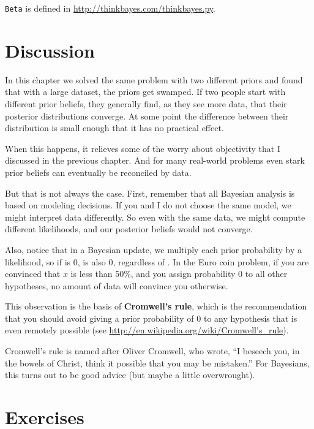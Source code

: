 \documentclass[12pt]{book}
\begin{document}
{\tt Beta} is defined in \url{http://thinkbayes.com/thinkbayes.py}.


\section{Discussion}

In this chapter we solved the same problem with two different 
priors and found that with a large dataset, the priors get
swamped.  If two people start with different
prior beliefs, they generally find, as they see more data, that
their posterior distributions converge.  At some point the
difference between their distribution is small enough that it has
no practical effect.

When this happens, it relieves some of the worry about objectivity
that I discussed in the previous chapter.  And for many real-world
problems even stark prior beliefs can eventually be reconciled
by data.

But that is not always the case.  First, remember that all Bayesian
analysis is based on modeling decisions.  If you and I do not
choose the same model, we might interpret data differently.  So
even with the same data, we might compute different likelihoods,
and our posterior beliefs would not converge.

Also, notice that in a Bayesian update, we multiply
each prior probability by a likelihood, so if  is 0,
 is also 0, regardless of .  In the Euro coin problem,
if you are convinced that $x$ is less than 50\%, and you assign
probability 0 to all other hypotheses, no amount of data will
convince you otherwise.

This observation is the basis of {\bf Cromwell's rule}, which is the
recommendation that you should avoid giving a prior probability of
0 to any hypothesis that is even remotely possible
(see \url{http://en.wikipedia.org/wiki/Cromwell's_rule}).

Cromwell's rule is named after Oliver Cromwell, who wrote, ``I beseech
you, in the bowels of Christ, think it possible that you may be
mistaken.''  For Bayesians, this turns out to be good advice (but
maybe a little overwrought).


\section{Exercises}
\end{document}
